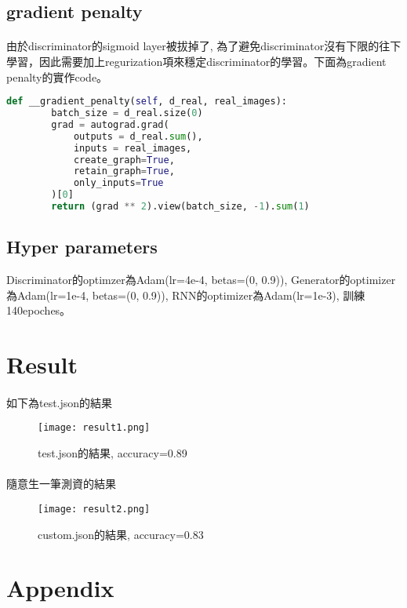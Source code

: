 \subsection{gradient penalty}
\paragraph{}
由於discriminator的sigmoid layer被拔掉了, 為了避免discriminator沒有下限的往下學習，因此需要加上regurization項來穩定discriminator的學習。下面為gradient penalty的實作code。
\begin{lstlisting}[language=Python]
    def __gradient_penalty(self, d_real, real_images):
        batch_size = d_real.size(0)
        grad = autograd.grad(
            outputs = d_real.sum(),
            inputs = real_images,
            create_graph=True,
            retain_graph=True,
            only_inputs=True
        )[0]
        return (grad ** 2).view(batch_size, -1).sum(1)
\end{lstlisting}
\subsection{Hyper parameters}
Discriminator的optimzer為Adam(lr=4e-4, betas=(0, 0.9)), Generator的optimizer為Adam(lr=1e-4, betas=(0, 0.9)), RNN的optimizer為Adam(lr=1e-3), 訓練140epoches。
\section{Result}
\paragraph{}
如下為test.json的結果
\begin{figure}[!ht]
    \begin{center} 
        \texttt{[image: result1.png]}
        \caption{test.json的結果, accuracy=0.89}
    \end{center} 
\end{figure}
\paragraph{}
隨意生一筆測資的結果
\begin{figure}[!ht]
    \begin{center} 
        \texttt{[image: result2.png]}
        \caption{custom.json的結果, accuracy=0.83}
    \end{center} 
\end{figure}
\section{Appendix}
